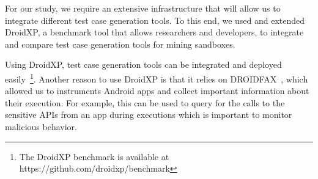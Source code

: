 For our study, we require an extensive infrastructure that will allow us to integrate different test case generation tools. To this end, we used and extended DroidXP\cite{DBLP:conf/scam/CostaMCMVBC20}, a benchmark tool that allows researchers and developers, to integrate and compare test case generation tools for mining sandboxes.

Using DroidXP, test case generation tools can be integrated and deployed easily~\footnote{The DroidXP benchmark is available at https://github.com/droidxp/benchmark}. Another reason to use DroidXP is that it relies on DROIDFAX~\cite{cai2016understanding}, which allowed us to instruments Android apps and collect important information about their execution. For example, this can be used to query for the calls to the sensitive APIs from an app during executions which is important to monitor malicious behavior. 

